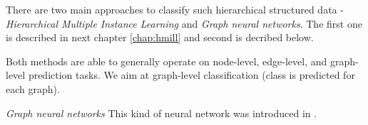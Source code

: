 There are two main approaches to classify such hierarchical structured data - \emph{Hierarchical Multiple Instance Learning} and \emph{Graph neural networks}. The first one is described in next chapter \ref{chap:hmill} and second is decribed below.

Both methods are able to generally operate on node-level, edge-level, and graph-level prediction tasks. We aim at graph-level classification (class is predicted for each graph).

\emph{Graph neural networks}
This kind of neural network was introduced in \cite{Scarselli2009}. 













